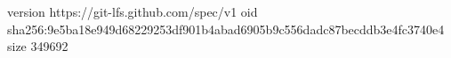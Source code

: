 version https://git-lfs.github.com/spec/v1
oid sha256:9e5ba18e949d68229253df901b4abad6905b9c556dadc87becddb3e4fc3740e4
size 349692
